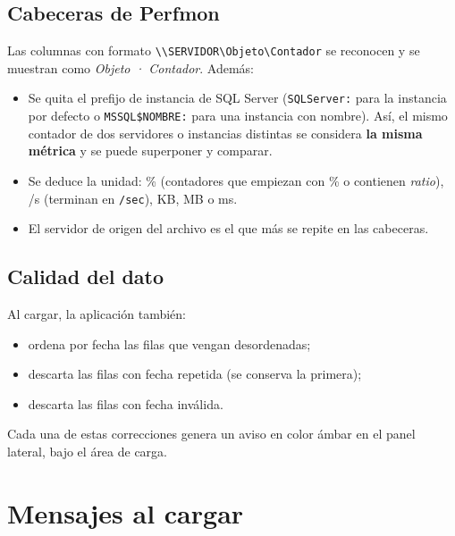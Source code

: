 \documentclass[11pt,a4paper,oneside]{report}
\newcommand{\bs}{\textbackslash}
\begin{document}
\subsection{Cabeceras de Perfmon}
Las columnas con formato
\texttt{\bs\bs SERVIDOR\bs Objeto\bs Contador} se reconocen y se
muestran como \emph{Objeto · Contador}. Además:
\begin{itemize}
  \item Se quita el prefijo de instancia de SQL Server
        (\texttt{SQLServer:} para la instancia por defecto o
        \texttt{MSSQL\$NOMBRE:} para una instancia con nombre). Así, el mismo
        contador de dos servidores o instancias distintas se considera
        \textbf{la misma métrica} y se puede superponer y comparar.
  \item Se deduce la unidad: \% (contadores que empiezan con \% o contienen
        \emph{ratio}), /s (terminan en \texttt{/sec}), KB, MB o ms.
  \item El servidor de origen del archivo es el que más se repite en las
        cabeceras.
\end{itemize}

\subsection{Calidad del dato}
Al cargar, la aplicación también:
\begin{itemize}
  \item ordena por fecha las filas que vengan desordenadas;
  \item descarta las filas con fecha repetida (se conserva la primera);
  \item descarta las filas con fecha inválida.
\end{itemize}
Cada una de estas correcciones genera un aviso en color ámbar en el panel
lateral, bajo el área de carga.

\section{Mensajes al cargar}
\end{document}
